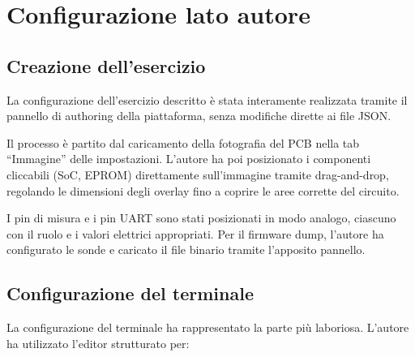 

\section{Configurazione lato autore}
\label{sec:configurazione-autore}

\subsection{Creazione dell'esercizio}
\label{subsec:creazione-esercizio}


La configurazione dell'esercizio descritto è stata interamente realizzata tramite il pannello di authoring della piattaforma, senza modifiche dirette ai file JSON.

Il processo è partito dal caricamento della fotografia del PCB nella tab ``Immagine'' delle impostazioni. L'autore ha poi posizionato i componenti cliccabili (SoC, EPROM) direttamente sull'immagine tramite drag-and-drop, regolando le dimensioni degli overlay fino a coprire le aree corrette del circuito.

I pin di misura e i pin UART sono stati posizionati in modo analogo, ciascuno con il ruolo e i valori elettrici appropriati. Per il firmware dump, l'autore ha configurato le sonde e caricato il file binario tramite l'apposito pannello.

\subsection{Configurazione del terminale}
\label{subsec:configurazione-terminale-autore}


La configurazione del terminale ha rappresentato la parte più laboriosa. L'autore ha utilizzato l'editor strutturato per:

